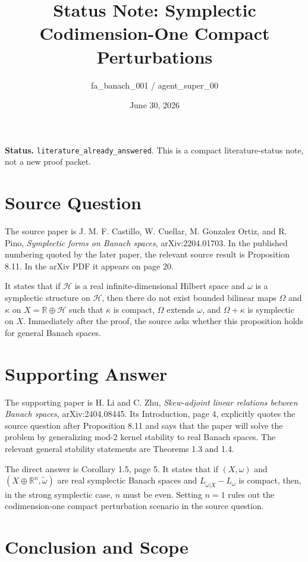 \documentclass[11pt]{article}
\title{Status Note: Symplectic Codimension-One Compact Perturbations}
\author{fa\_banach\_001 / agent\_super\_00}
\date{June 30, 2026}
\begin{document}
\maketitle

\noindent\textbf{Status.}
\texttt{literature\_already\_answered}. This is a compact literature-status
note, not a new proof packet.

\section*{Source Question}

The source paper is J. M. F. Castillo, W. Cuellar, M. Gonzalez Ortiz, and
R. Pino, \emph{Symplectic forms on Banach spaces}, arXiv:2204.01703. In the
published numbering quoted by the later paper, the relevant source result is
Proposition 8.11. In the arXiv PDF it appears on page 20.

It states that if $\mathcal H$ is a real infinite-dimensional Hilbert space and
$\omega$ is a symplectic structure on $\mathcal H$, then there do not exist
bounded bilinear maps $\Omega$ and $\kappa$ on $X=\mathbb R\oplus\mathcal H$
such that $\kappa$ is compact, $\Omega$ extends $\omega$, and
$\Omega+\kappa$ is symplectic on $X$. Immediately after the proof, the source
asks whether this proposition holds for general Banach spaces.

\section*{Supporting Answer}

The supporting paper is H. Li and C. Zhu, \emph{Skew-adjoint linear relations
between Banach spaces}, arXiv:2404.08445. Its Introduction, page 4, explicitly
quotes the source question after Proposition 8.11 and says that the paper will
solve the problem by generalizing mod-2 kernel stability to real Banach
spaces. The relevant general stability statements are Theorems 1.3 and 1.4.

The direct answer is Corollary 1.5, page 5. It states that if $(X,\omega)$ and
$(X\oplus\mathbb R^n,\widetilde\omega)$ are real symplectic Banach spaces and
$L_{\widetilde\omega|X}-L_\omega$ is compact, then, in the strong symplectic
case, $n$ must be even. Setting $n=1$ rules out the codimension-one compact
perturbation scenario in the source question.

\section*{Conclusion and Scope}
\end{document}
